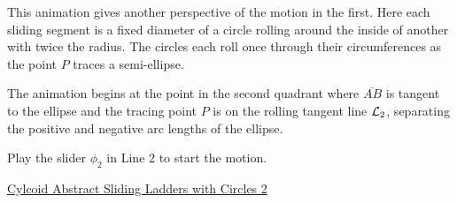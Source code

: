 \documentclass{ximera}
\begin{document}
\begin{exploration} \label{LadderwithCircles}
This animation gives another perspective of the motion in the first. Here each sliding segment is a fixed diameter of a circle rolling around the inside of another with twice the radius. The circles each roll once through their circumferences as the point $P$ traces a semi-ellipse. 

The animation begins at the point in the second quadrant where $\overline{AB}$ is tangent to the ellipse and the tracing point $P$ is on the rolling tangent line ${\cal L}_2$, separating the positive and negative arc lengths of the ellipse. 


Play the slider $\phi_2$ in Line 2 to start the motion.

\begin{onlineOnly}
    \begin{center}
\end{center}
\end{onlineOnly}

\href{https://www.desmos.com/calculator/wcvw7kjsdd}{Cylcoid Abstract Sliding Ladders with Circles 2}
\end{exploration}
\end{document}
